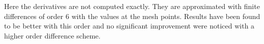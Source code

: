 \documentclass[proc]{edpsmath}
\begin{document}
\rmrk Here the derivatives are not computed exactly. They are approximated with finite differences of order 6 with the values at the mesh points. Results have been found to be better with this order and no significant improvement were noticed with a higher order difference scheme.
%
%
%
%
%
%
%
%
%
%
%
%
%
%
\end{document}
